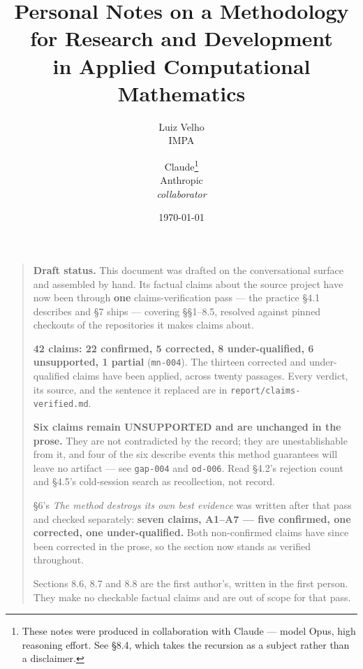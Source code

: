 \documentclass[11pt]{article}
\title{Personal Notes on a Methodology for Research and Development\\
       in Applied Computational Mathematics}
\author{
  Luiz Velho \\
  \normalsize IMPA
  \and
  Claude\thanks{These notes were produced in collaboration with Claude ---
    model Opus, high reasoning effort. See \S8.4, which takes the recursion as a
    subject rather than a disclaimer.} \\
  \normalsize Anthropic \\
  \normalsize \textit{collaborator}
}
\date{\today}
\begin{document}
\maketitle

\begin{quote}
\small\sloppy
\textbf{Draft status.} This document was drafted on the conversational surface
and assembled by hand. Its factual claims about the source project have now been
through \textbf{one} claims-verification pass --- the practice \S4.1 describes
and \S7 ships --- covering \S\S1--8.5, resolved against pinned checkouts of the
repositories it makes claims about.

\textbf{42 claims: 22 confirmed, 5 corrected, 8 under-qualified, 6 unsupported,
1 partial} (\texttt{mn-004}). The thirteen corrected and under-qualified claims
have been applied, across twenty passages. Every verdict, its source, and the
sentence it replaced are in \texttt{report/claims-verified.md}.

\textbf{Six claims remain UNSUPPORTED and are unchanged in the prose.} They are
not contradicted by the record; they are unestablishable from it, and four of the
six describe events this method guarantees will leave no artifact --- see
\texttt{gap-004} and \texttt{od-006}. Read \S4.2's rejection count and \S4.5's
cold-session search as recollection, not record.

\S6's \textit{The method destroys its own best evidence} was written after that
pass and checked separately: \textbf{seven claims, A1--A7 --- five confirmed, one
corrected, one under-qualified.} Both non-confirmed claims have since been
corrected in the prose, so the section now stands as verified throughout.

Sections 8.6, 8.7 and 8.8 are the first author's, written in the first person.
They make no checkable factual claims and are out of scope for that pass.
\end{quote}










\appendix

\end{document}
